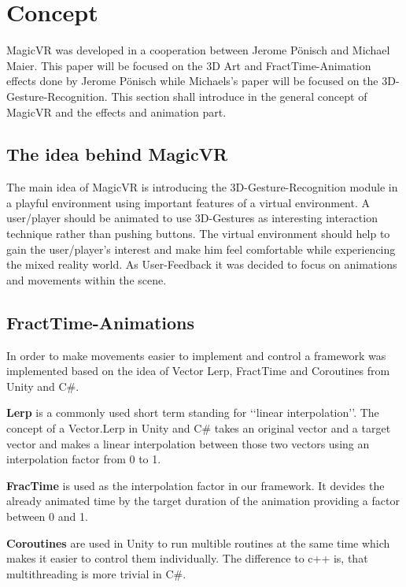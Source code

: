 \section{Concept}

MagicVR was developed in a cooperation between Jerome Pönisch and Michael Maier. This paper will be focused on the 3D Art and FractTime-Animation effects done by Jerome Pönisch while Michaels\rq{}s paper will be focused on the 3D-Gesture-Recognition.
This section shall introduce in the general concept of MagicVR and the effects and animation part.

\subsection{The idea behind MagicVR}

The main idea of MagicVR is introducing the 3D-Gesture-Recognition module in a playful environment using important features of a virtual environment. A user/player should be animated to use 3D-Gestures as interesting interaction technique rather than pushing buttons. The virtual environment should help to gain the user/player\rq{}s interest and make him feel comfortable while experiencing the mixed reality world. As User-Feedback it was decided to focus on animations and movements within the scene.

\subsection{FractTime-Animations}

In order to make movements easier to implement and control a framework was implemented based on the idea of Vector Lerp, FractTime and Coroutines from Unity and C\#.
\begin{description}
 \item{\textbf{Lerp}} is a commonly used short term standing for \lq\lq{}linear interpolation\rq\rq{}. The concept of a Vector.Lerp in Unity and C\# takes an original vector and a target vector and makes a linear interpolation between those two vectors using an interpolation factor from 0 to 1.
 
 \item{\textbf{FracTime}} is used as the interpolation factor in our framework. It devides the already animated time by the target duration of the animation providing a factor between 0 and 1.
 
 \item{\textbf{Coroutines}} are used in Unity to run multible routines at the same time which makes it easier to control them individually. The difference to c++ is, that multithreading is more trivial in C\#.
 \end{description}
 
